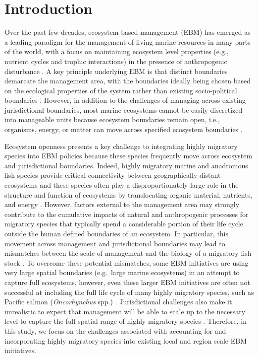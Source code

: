 \section{Introduction}

Over the past few decades, ecosystem-based management (EBM) has emerged
as a leading paradigm for the management of living marine resources in
many parts of the world, with a focus on maintaining ecosystem level
properties (e.g., nutrient cycles and trophic interactions) in the
presence of anthropogenic disturbance
\citep{Engler2015, Skjoldal2008, Fletcher2008, Constable2011, Olsson2008}.
A key principle underlying EBM is that distinct boundaries demarcate the
management area, with the boundaries ideally being chosen based on the
ecological properties of the system rather than existing socio-political
boundaries \citep{Long2015, Engler2015}. However, in addition to the
challenges of managing across existing jurisdictional boundaries, most
marine ecosystems cannot be easily discretized into manageable units
because ecosystem boundaries remain open, i.e., organisms, energy, or
matter can move across specified ecosystem boundaries
\citep{ONeill2001}.

Ecosystem openness presents a key challenge to integrating highly
migratory species into EBM policies because these species frequently
move across ecosystem and jurisdictional boundaries. Indeed, highly
migratory marine and anadromous fish species provide critical
connectivity between geographically distant ecosystems and these species
often play a disproportionately large role in the structure and function
of ecosystems by translocating organic material, nutrients, and energy
\citep{Lundberg2003, Heupel2015}. However, factors external to the
management area may strongly contribute to the cumulative impacts of
natural and anthropogenic processes for migratory species that typically
spend a considerable portion of their life cycle outside the human
defined boundaries of an ecosystem. In particular, this movement across
management and jurisdictional boundaries may lead to mismatches between
the scale of management and the biology of a migratory fish stock
\citep{Cash2006a, Epstein2015}. To overcome these potential mismatches,
some EBM initiatives are using very large spatial boundaries (e.g.~large
marine ecosystems) in an attempt to capture full ecosystems, however,
even these larger EBM initiatives are often not successful at including
the full life cycle of many highly migratory species, such as Pacific
salmon (\emph{Oncorhynchus} spp.) \citep{Field2006a, Sherman1999, Wang2004}.
Jurisdictional challenges also make it unrealistic to expect that management
will be able to scale up to the necessary level to capture the full spatial
range of highly migratory species \citep{Cowan2012, Lascelles2014}. Therefore,
in this study, we focus on the challenges associated with accounting for and
incorporating highly migratory species into existing local and region
scale EBM initiatives.

